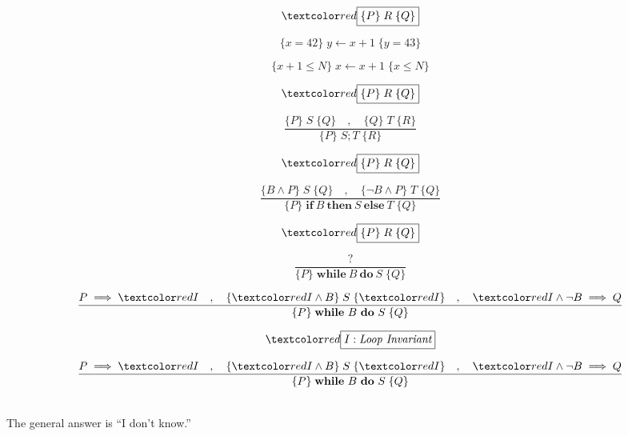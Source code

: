 \begin{frame}
  \[
    \red{\boxed{\set{P}\; R\; \set{Q}}}
  \]
  
  \vspace{0.30cm}
  \[
    \{ x = 42 \}\;   y \gets x + 1\;   \{ y = 43 \}
  \]
  
  \pause
  \[
    \{ x + 1 \leq N \}\;  x \gets x + 1\;  \{ x \leq N \}
  \]
\end{frame}

\begin{frame}
  \[
    \red{\boxed{\set{P}\; R\; \set{Q}}}
  \]
  
  \vspace{0.60cm}
  \[
    \dfrac{\{P\}\; S\; \{Q\} \quad,\quad \{Q\}\; T\; \{R\}}
    {\{P\}\; S;T\; \{R\}}
  \]
\end{frame}

\begin{frame}
  \[
    \red{\boxed{\set{P}\; R\; \set{Q}}}
  \]
  
  \vspace{0.60cm}
  \[
    \dfrac{\{B \wedge P\}\; S\; \{Q\} \quad,\quad 
    \{\neg B \wedge P \}\; T\; \{Q\}}
    {\{P\}\; \textbf{if}\ B\ \textbf{then}\ S\ \textbf{else}\ T\; \{Q\}}
  \]
\end{frame}

\begin{frame}
  \[
    \red{\boxed{\set{P}\; R\; \set{Q}}}
  \]
  
  \vspace{0.60cm}
  \[
    \dfrac{?}
    {\{P\}\; \textbf{while}\ B\ \textbf{do}\ S\; \{Q\}}
  \]
  
  \pause
  \vspace{0.60cm}
  \[
    \dfrac{P \implies \red{I} \quad,\quad \{\red{I} \wedge B\}\; S\; \{\red{I}\}
    \quad,\quad \red{I} \land \lnot B \implies Q}
    {\{P\}\; \textbf{while}\ B\ \textbf{do}\ S\; \{Q\}}
  \]
  
  \pause
  \vspace{0.60cm}
  \[
    \red{\boxed{I: \text{\it Loop Invariant}}}
  \]
\end{frame}

\begin{frame}
  \[
    \dfrac{P \implies \red{I} \quad,\quad \{\red{I} \wedge B\}\; S\; \{\red{I}\}
    \quad,\quad \red{I} \land \lnot B \implies Q}
    {\{P\}\; \textbf{while}\ B\ \textbf{do}\ S\; \{Q\}}
  \]
  
  \pause
  \vspace{0.30cm}
  \begin{center}
      \\[10pt]  \pause
    The general answer is ``I don't know.''
  \end{center}
  
  \pause
\end{frame}

